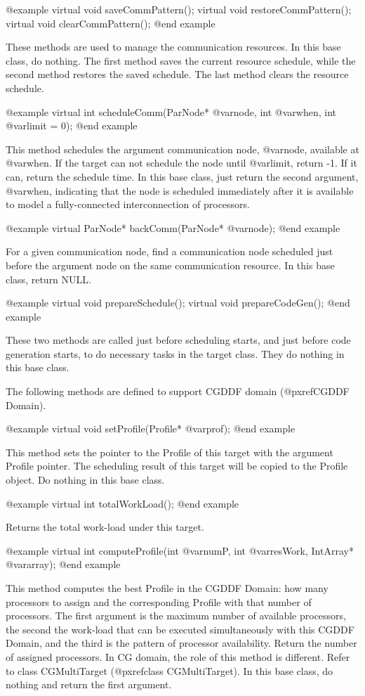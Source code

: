 @example
virtual void saveCommPattern();
virtual void restoreCommPattern();
virtual void clearCommPattern();
@end example

These methods are used to manage the communication resources. In this base
class, do nothing. The first method saves the current resource schedule,
while the second method restores the saved schedule. The last method clears
the resource schedule.

@example
virtual int scheduleComm(ParNode* @var{node}, int @var{when}, int @var{limit} = 0);
@end example

This method schedules the argument communication node, @var{node}, available
at @var{when}. If the target can not schedule the node until @var{limit},
return -1. If it can, return the schedule time. In this base class, just return
the second argument, @var{when}, indicating that the node is scheduled
immediately after it is available to model a fully-connected interconnection of
processors.

@example
virtual ParNode* backComm(ParNode* @var{node});
@end example

For a given communication node, find a communication node scheduled just before
the argument node on the same communication resource. In this base class,
return NULL.

@example
virtual void prepareSchedule();
virtual void prepareCodeGen();
@end example

These two methods are called just before scheduling starts, and just
before code generation starts, to do necessary tasks in the target class.
They do nothing in this base class.

The following methods are defined to support CGDDF domain 
(@pxref{CGDDF Domain}).

@example
virtual void setProfile(Profile* @var{prof});
@end example

This method sets the pointer to the Profile of this target with the argument
Profile pointer. The scheduling result of this target will be copied to the
Profile object. Do nothing in this base class.

@example
virtual int totalWorkLoad();
@end example

Returns the total work-load under this target.

@example
virtual int computeProfile(int @var{numP}, int @var{resWork}, IntArray* @var{array});
@end example

This method computes the best Profile in the CGDDF Domain: how many 
processors to assign and the corresponding Profile with that number 
of processors. The first argument is the maximum number of available 
processors, the second the work-load that can be executed simultaneously 
with this CGDDF Domain, and the third is the pattern of processor availability.
Return the number of assigned processors.
In CG domain, the role of this method is different. Refer to class
CGMultiTarget (@pxref{class CGMultiTarget}). In this base class, do nothing 
and return the first argument. 

